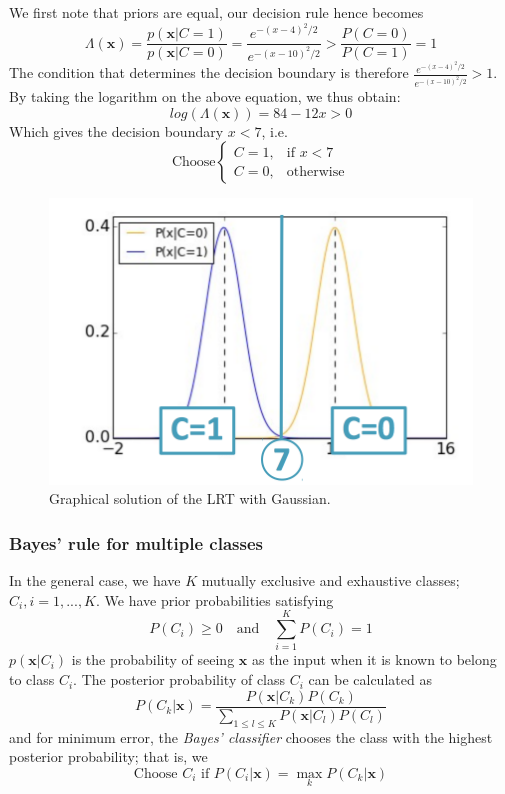 \documentclass[a4paper,12pt]{article}
\newcommand{\xx}{{\bm x}}
\begin{document}
We first note that priors are equal, our decision rule hence becomes
\begin{equation*}
\Lambda(\xx) = \frac{p(\xx|C=1)}{p(\xx|C=0)} = \frac{e^{-(x-4)^2 /2}}{e^{-(x-10)^2 /2}} > \frac{P(C=0)}{P(C=1)} = 1
\end{equation*}
The condition that determines the decision boundary is therefore $\frac{e^{-(x-4)^2 /2}}{e^{-(x-10)^2 /2}} >1$. By taking the logarithm on the above equation, we thus obtain:
\begin{equation*}
log(\Lambda(\xx)) = 84 - 12x > 0
\end{equation*}
Which gives the decision boundary $x<7$, i.e.
\begin{equation*}
\text{Choose}
\begin{cases}
C = 1, & \text{if } x < 7\\
C = 0, & \text{otherwise}
\end{cases}
\end{equation*}
\begin{figure}[h]
\centering
\includegraphics[scale=0.4]{lrtgaussian}
\caption{Graphical solution of the LRT with Gaussian.}
    \label{fig:creditscoring}
\end{figure}
\subsubsection{Bayes' rule for multiple classes}
In the general case, we have $K$ mutually exclusive and exhaustive classes; $C_i, i=1,...,K$. We have prior probabilities satisfying 
$$ P(C_i) \geq 0 \quad \text{and} \quad \sum\limits_{i=1}^K P(C_i)=1$$
$p(\xx|C_i)$ is the probability of seeing $\xx$ as the input when it is known to belong to class $C_i$. The posterior probability of class $C_i$ can be calculated as
$$P(C_{k}|\xx) = \dfrac{P(\xx|C_{k})P(C_{k})}{\sum\limits_{1 \leq l \leq K}{P(\xx|C_{l})P(C_{l})}}$$ and for minimum error, the \textit{Bayes' classifier} chooses the class with the highest posterior probability; that is, we
$$ \text{Choose } C_i \text{ if } P(C_i|\xx) = \max \limits_k P(C_k|\xx)$$
\end{document}

